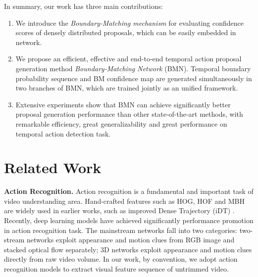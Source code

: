 \documentclass[10pt,twocolumn,letterpaper]{article}
\begin{document}
In summary, our work has three main contributions:

\begin{enumerate}
\setlength{\itemsep}{0pt}
\setlength{\parsep}{0pt}
\setlength{\parskip}{0pt}

\item We introduce the \emph{Boundary-Matching mechanism} for evaluating confidence scores  of densely distributed proposals, which can be easily embedded in network.

\item We propose an efficient, effective and end-to-end temporal action proposal generation method \emph{Boundary-Matching Network} (BMN). Temporal boundary probability sequence and BM confidence map are generated simultaneously in two branches of BMN, which are trained jointly as an unified framework.

\item Extensive experiments show that BMN can achieve significantly better proposal generation performance than other state-of-the-art methods, with remarkable efficiency, great generalizability and great performance on temporal action detection task.
 
\end{enumerate}



\section{Related Work}

\noindent
\textbf{Action Recognition.}
%
Action recognition is a fundamental and important task of video understanding area.
%
Hand-crafted features such as HOG, HOF and MBH are widely used in earlier works, such as improved Dense Trajectory (iDT) \cite{dtf,wang2013action}.
%
Recently, deep learning models have achieved significantly performance promotion in action recognition task. 
%
The mainstream networks fall into two categories: two-stream networks \cite{feichtenhofer2016convolutional,simonyan2014two,wang2015towards} exploit appearance and motion clues from RGB image and stacked optical flow separately; 3D networks \cite{tran2015learning,qiu2017learning}  exploit appearance and motion clues directly from raw video volume.
%
In our work, by convention, we adopt action recognition models to extract visual feature sequence of untrimmed video. 
\end{document}
